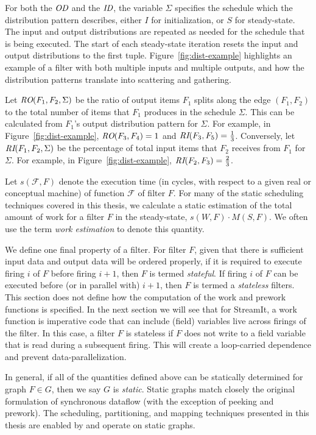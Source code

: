 For both the $\mbox{\it OD}$ and the $\mbox{\it ID}$, the variable
$\Sigma$ specifies the schedule which the distribution pattern
describes, either $I$ for initialization, or $S$ for steady-state.
The input and output distributions are repeated as needed for the
schedule that is being executed.  The start of each steady-state
iteration resets the input and output distributions to the first tuple.
Figure~\ref{fig:dist-example} highlights an example of a filter with
both multiple inputs and multiple outputs, and how the distribution
patterns translate into scattering and gathering.

Let $\mbox{\it RO}(F_1, F_2, \Sigma)$ be the ratio of output items $F_1$
splits along the edge $(F_1, F_2)$ to the total number of items that
$F_1$ produces in the schedule $\Sigma$.  This can be calculated from
$F_1$'s output distribution pattern for $\Sigma$.  For example, in
Figure~\ref{fig:dist-example}, $\mbox{\it RO}(F_3, F_4) = 1$ and
$\mbox{\it RI}(F_3, F_5) = \frac{1}{3}$.  Conversely, let $\mbox{\it RI}(F_1, F_2,
\Sigma)$ be the percentage of total input items that $F_2$ receives
from $F_1$ for $\Sigma$.  For example, in
Figure~\ref{fig:dist-example}, $\mbox{\it RI}(F_2,F_3) = \frac{2}{3}$.

Let $s(\mathcal{F}, F)$ denote the execution time (in cycles, with
respect to a given real or conceptual machine) of function
$\mathcal{F}$ of filter $F$.  For many of the static scheduling
techniques covered in this thesis, we calculate a static estimation of
the total amount of work for a filter $F$ in the steady-state, $s(W,
F) \cdot M(S, F)$.  We often use the term {\it work estimation} to
denote this quantity.

We define one final property of a filter.  For filter $F$, given that
there is sufficient input data and output data will be ordered
properly, if it is required to execute firing $i$ of $F$ before firing
$i+1$, then $F$ is termed {\it stateful}.  If firing $i$ of $F$ can be
executed before (or in parallel with) $i+1$, then $F$ is termed a {\it
  stateless} filters.  This section does not define how the
computation of the work and prework functions is specified.  In the
next section we will see that for StreamIt, a work function is
imperative code that can include (field) variables live across firings
of the filter.  In this case, a filter $F$ is stateless if $F$ does
not write to a field variable that is read during a subsequent firing.
This will create a loop-carried dependence and prevent
data-parallelization.

In general, if all of the quantities defined above can be statically
determined for graph $F \in G$, then we say $G$ is {\it static}.
Static graphs match closely the original formulation of synchronous
dataflow (with the exception of peeking and prework).  The scheduling,
partitioning, and mapping techniques presented in this thesis are
enabled by and operate on static graphs.
